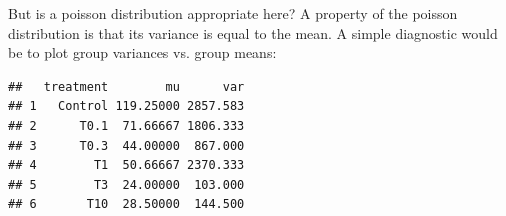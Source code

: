 But is a poisson distribution appropriate here? 
A property of the poisson distribution is that its variance is equal to the mean. 
A simple diagnostic would be to plot group variances vs. group means:

\begin{knitrout}
\color{fgcolor}\begin{kframe}
\begin{alltt}
 \hlkwb{<-}  
               \hlstd{=} 
               \hlstd{=} 
\end{alltt}
\begin{verbatim}
##   treatment        mu      var
## 1   Control 119.25000 2857.583
## 2      T0.1  71.66667 1806.333
## 3      T0.3  44.00000  867.000
## 4        T1  50.66667 2370.333
## 5        T3  24.00000  103.000
## 6       T10  28.50000  144.500
\end{verbatim}
\begin{alltt}
 \hlopt{~}   
      \hlstd{=} \hlstd{,}  \hlstd{=} \hlstd{,}  \hlstd{=} \hlstd{)}
\hlstd{(} \hlstd{=} \hlstd{,}  \hlstd{=} \hlstd{,}  \hlstd{=} \hlstd{,}  \hlstd{=} \hlstd{)}
\hlstd{(} \hlstd{=} \hlstd{,}  \hlstd{=} \hlstd{,}  \hlstd{=} \hlstd{,}  \hlstd{=} \hlstd{)}
 \hlopt{+} \hlopt{^} \hlopt{/} \hlstd{),}  \hlstd{=} \hlstd{,}  \hlstd{=} \hlstd{,}  \hlstd{=} \hlstd{,}
       \hlstd{=} \hlstd{,}  \hlstd{=} \hlstd{)}
\hlstd{(}\hlstd{,}
        \hlstd{=} \hlstd{(}\hlstd{,} \hlstd{,} \hlstd{),}
        \hlstd{=} \hlstd{(}\hlstd{,} \hlstd{,} \hlstd{),}
        \hlstd{=} \hlstd{(}\hlstd{,}\hlstd{,} \hlstd{),}
        \hlstd{=} \hlstd{(}\hlstd{,}\hlstd{,} \hlstd{))}
\end{alltt}
\end{kframe}


\end{knitrout}
